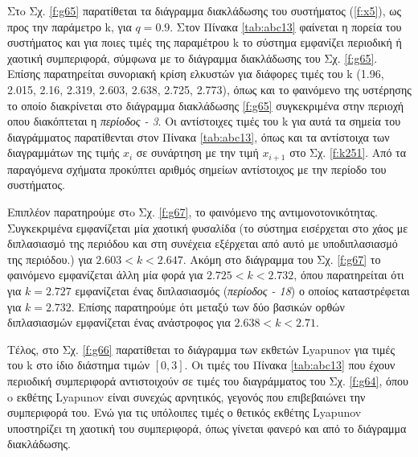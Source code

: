Στo Σχ. \ref{f:g65} παρατίθεται τα διάγραμμα διακλάδωσης του συστήματος (\ref{f:x5}), ως προς την παράμετρο k, για $q =0.9$. Στον Πίνακα \ref{tab:abc13} φαίνεται η πορεία του συστήματος και για ποιες τιμές της παραμέτρου k το σύστημα εμφανίζει περιοδική ή χαοτική συμπεριφορά, σύμφωνα με το διάγραμμα διακλάδωσης του Σχ. \ref{f:g65}. Επίσης παρατηρείται συνοριακή κρίση ελκυστών για διάφορες τιμές του k (1.96, 2.015, 2.16, 2.319, 2.603, 2.638, 2.725, 2.773), όπως και το φαινόμενο της υστέρησης το οποίο διακρίνεται στο διάγραμμα διακλάδωσης \ref{f:g65} συγκεκριμένα στην περιοχή οπου διακόπτεται η \emph{περίοδος - 3}. Οι αντίστοιχες τιμές του k για αυτά τα σημεία του διαγράμματος παρατίθενται στον Πίνακα \ref{tab:abc13}, όπως και τα αντίστοιχα των διαγραμμάτων της τιμής \(x_i\) σε συνάρτηση με την τιμή \(x_{i+1}\) στο Σχ. \ref{f:k251}. Από τα παραγόμενα σχήματα προκύπτει αριθμός σημείων αντίστοιχος με την περίοδο του συστήματος.

Επιπλέον παρατηρούμε στo Σχ. \ref{f:g67}, το φαινόμενο της αντιμονοτονικότητας. Συγκεκριμένα εμφανίζεται μία χαοτική φυσαλίδα (το σύστημα εισέρχεται στο χάος με διπλασιασμό της περιόδου και στη συνέχεια εξέρχεται από αυτό με υποδιπλασιασμό της περιόδου.) για $2.603<k<2.647$. Ακόμη στο διάγραμμα του Σχ. \ref{f:g67} το φαινόμενο εμφανίζεται άλλη μία φορά για $2.725<k<2.732$, όπου παρατηρείται ότι για $k=2.727$ εμφανίζεται ένας διπλασιασμός (\emph{περίοδος - 18}) ο οποίος καταστρέφεται για $k=2.732$.
Επίσης παρατηρούμε ότι μεταξύ των δύο βασικών ορθών διπλασιασμών εμφανίζεται ένας ανάστροφος για $2.638<k<2.71$.

Τέλος, στο Σχ. \ref{f:g66} παρατίθεται το διάγραμμα των εκθετών Lyapunov για τιμές του k στο ίδιο διάστημα τιμών $[0, 3]$. Οι τιμές του Πίνακα \ref{tab:abc13} που έχουν περιοδική συμπεριφορά αντιστοιχούν σε τιμές του διαγράμματος του Σχ. \ref{f:g64}, όπου o εκθέτης Lyapunov είναι συνεχώς αρνητικός, γεγονός που επιβεβαιώνει την συμπεριφορά του. Ενώ για τις υπόλοιπες τιμές ο θετικός εκθέτης Lyapunov υποστηρίζει τη χαοτική του συμπεριφορά, όπως γίνεται φανερό και από το διάγραμμα διακλάδωσης.\\\\

